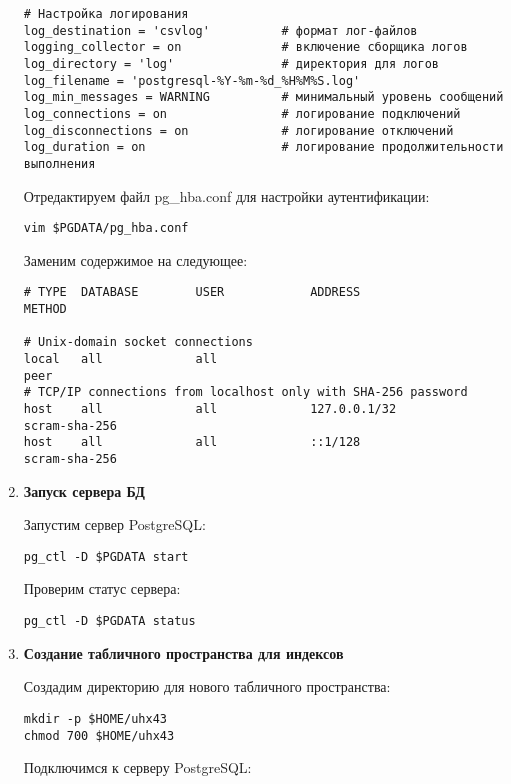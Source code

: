\begin{enumerate}
\begin{verbatim}
# Настройка логирования
log_destination = 'csvlog'          # формат лог-файлов
logging_collector = on              # включение сборщика логов
log_directory = 'log'               # директория для логов
log_filename = 'postgresql-%Y-%m-%d_%H%M%S.log'
log_min_messages = WARNING          # минимальный уровень сообщений
log_connections = on                # логирование подключений
log_disconnections = on             # логирование отключений
log_duration = on                   # логирование продолжительности выполнения
\end{verbatim}

Отредактируем файл pg\_hba.conf для настройки аутентификации:

\begin{verbatim}
vim $PGDATA/pg_hba.conf
\end{verbatim}

Заменим содержимое на следующее:

\begin{verbatim}
# TYPE  DATABASE        USER            ADDRESS                 METHOD

# Unix-domain socket connections
local   all             all                                     peer
# TCP/IP connections from localhost only with SHA-256 password
host    all             all             127.0.0.1/32            scram-sha-256
host    all             all             ::1/128                 scram-sha-256
\end{verbatim}

\item \textbf{Запуск сервера БД}

Запустим сервер PostgreSQL:

\begin{verbatim}
pg_ctl -D $PGDATA start
\end{verbatim}

Проверим статус сервера:

\begin{verbatim}
pg_ctl -D $PGDATA status
\end{verbatim}

\item \textbf{Создание табличного пространства для индексов}

Создадим директорию для нового табличного пространства:

\begin{verbatim}
mkdir -p $HOME/uhx43
chmod 700 $HOME/uhx43
\end{verbatim}

Подключимся к серверу PostgreSQL:


\end{enumerate}
